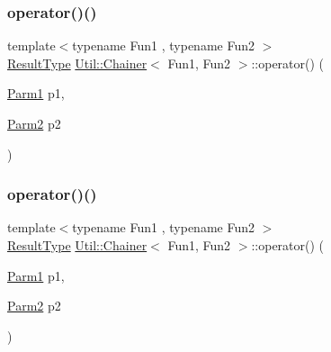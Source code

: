 \subsubsection{\texorpdfstring{operator()()}{operator()()}\hspace{0.1cm}{\footnotesize\ttfamily [8/18]}}
{\footnotesize\ttfamily template$<$typename Fun1 , typename Fun2 $>$ \\
\mbox{\hyperlink{classUtil_1_1Chainer_a2c8d88a77b8ba93eb915dc799ddafbb9}{Result\+Type}} \mbox{\hyperlink{classUtil_1_1Chainer}{Util\+::\+Chainer}}$<$ Fun1, Fun2 $>$\+::operator() (\begin{DoxyParamCaption}\item[{\mbox{\hyperlink{classUtil_1_1Chainer_a3e09b2267dabdd8d12070b09c47749c6}{Parm1}}}]{p1,  }\item[{\mbox{\hyperlink{classUtil_1_1Chainer_a1bfb0e8f35679278c85d232a74a107ff}{Parm2}}}]{p2 }\end{DoxyParamCaption})\hspace{0.3cm}{\ttfamily [inline]}}

\mbox{\label{classUtil_1_1Chainer_af5e43ed56a289b68e7704727ef552208}} 
\subsubsection{\texorpdfstring{operator()()}{operator()()}\hspace{0.1cm}{\footnotesize\ttfamily [9/18]}}
{\footnotesize\ttfamily template$<$typename Fun1 , typename Fun2 $>$ \\
\mbox{\hyperlink{classUtil_1_1Chainer_a2c8d88a77b8ba93eb915dc799ddafbb9}{Result\+Type}} \mbox{\hyperlink{classUtil_1_1Chainer}{Util\+::\+Chainer}}$<$ Fun1, Fun2 $>$\+::operator() (\begin{DoxyParamCaption}\item[{\mbox{\hyperlink{classUtil_1_1Chainer_a3e09b2267dabdd8d12070b09c47749c6}{Parm1}}}]{p1,  }\item[{\mbox{\hyperlink{classUtil_1_1Chainer_a1bfb0e8f35679278c85d232a74a107ff}{Parm2}}}]{p2 }\end{DoxyParamCaption})\hspace{0.3cm}{\ttfamily [inline]}}

\mbox{\label{classUtil_1_1Chainer_af0f81081283f192626e5a83eb688f573}} 
